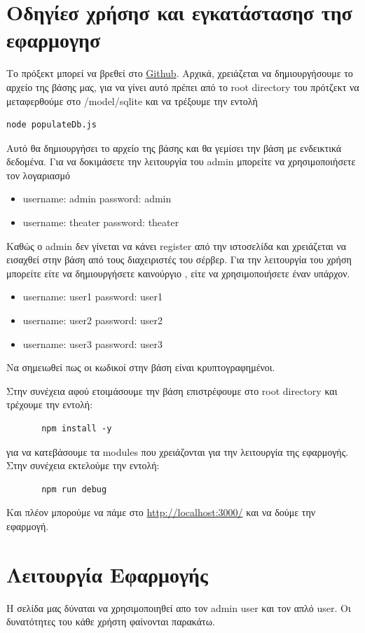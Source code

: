\documentclass{acmart}
\begin{document}
\section{Οδηγίεσ χρήσησ και εγκατάστασησ τησ εφαρμογησ}
Το πρόξεκτ μπορεί να βρεθεί στο \href{https://github.com/KonstantoJr/web_dev_project}{Github}.
Αρχικά, χρειάζεται να δημιουργήσουμε το αρχείο της βάσης μας, για να γίνει αυτό πρέπει από το root directory
του πρότζεκτ να μεταφερθούμε στο /model/sqlite και να τρέξουμε την εντολή 
\begin{lstlisting}
node populateDb.js 
\end{lstlisting}
Αυτό θα δημιουργήσει το αρχείο της βάσης και θα γεμίσει την βάση με ενδεικτικά δεδομένα.
Για να δοκιμάσετε την λειτουργία του admin μπορείτε να χρησιμοποιήσετε τον λογαριασμό 
\begin{itemize}
       \item username: admin password: admin
       \item username: theater password: theater
\end{itemize}
Καθώς ο admin δεν γίνεται να κάνει register από την ιστοσελίδα και χρειάζεται να εισαχθεί στην βάση από τους 
διαχειριστές του σέρβερ.
Για την λειτουργία του χρήση μπορείτε είτε να δημιουργήσετε καινούργιο , είτε να χρησιμοποιήσετε έναν υπάρχον.
\begin{itemize}
       \item username: user1 password: user1
       \item username: user2 password: user2
       \item username: user3 password: user3     
\end{itemize}
Να σημειωθεί πως οι κωδικοί στην βάση είναι κρυπτογραφημένοι.

Στην συνέχεια αφού ετοιμάσουμε την βάση επιστρέφουμε στο root directory και τρέχουμε την εντολή:
\begin{lstlisting}
       npm install -y 
\end{lstlisting}
για να κατεβάσουμε τα modules που χρειάζονται για την λειτουργία της εφαρμογής.
Στην συνέχεια εκτελούμε την εντολή:
\begin{lstlisting}
       npm run debug
\end{lstlisting}
Και πλέον μπορούμε να πάμε στο \url{http://localhost:3000/} και να δούμε την εφαρμογή.


\section{Λειτουργία Εφαρμογής}
Η σελίδα μας δύναται να χρησιμοποιηθεί απο τον admin user και τον απλό user. Οι δυνατότητες του κάθε χρήστη φαίνονται παρακάτω.
\end{document}
